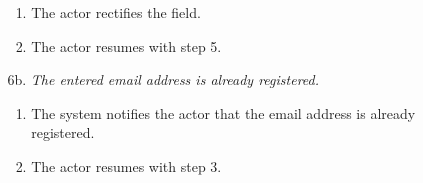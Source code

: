 \begin{enumerate}
\begin{itemize}
\begin{itemize}
\begin{enumerate}
            \item The actor rectifies the field.
            \item The actor resumes with step 5.
        \end{enumerate}
        \item[6b.] \textit{The entered email address is already registered.}
        \begin{enumerate}
            \item The system notifies the actor that the email address is already registered.
            \item The actor resumes with step 3.
        \end{enumerate}
    \end{itemize}
\end{itemize}

\vspace{0.5em}


\end{enumerate}
